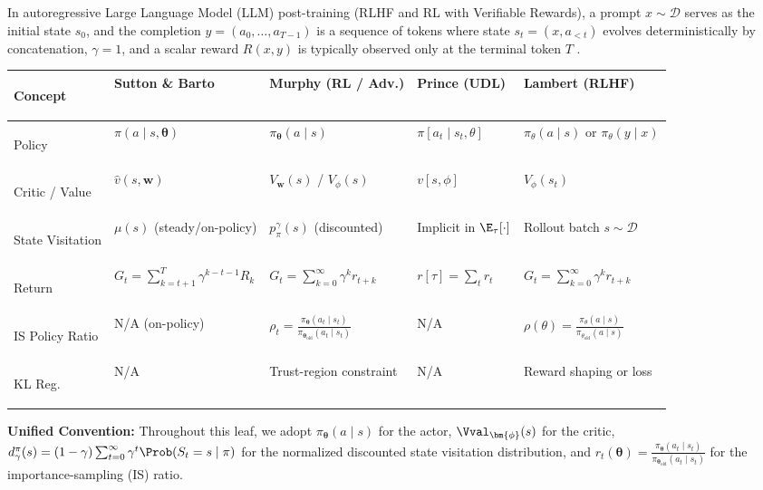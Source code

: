 \documentclass[../../../../master.tex]{subfiles}
\begin{document}
In autoregressive Large Language Model (LLM) post-training (RLHF and RL with Verifiable Rewards), a prompt $x \sim \mathcal{D}$ serves as the initial state $s_0$, and the completion $y = (a_0, \dots, a_{T-1})$ is a sequence of tokens where state $s_t = (x, a_{<t})$ evolves deterministically by concatenation, $\gamma = 1$, and a scalar reward $R(x, y)$ is typically observed only at the terminal token $T$ .

\begin{crossbook}
\footnotesize
\begin{tabularx}{\textwidth}{@{}>{\bfseries\raggedright\arraybackslash}p{2.1cm} X X X X@{}}
\toprule
Concept & Sutton \& Barto & Murphy (RL / Adv.) & Prince (UDL) & Lambert (RLHF) \\
\midrule
Policy & $\pi(a \mid s, \bm{\theta})$ & $\pi_{\bm{\theta}}(a \mid s)$ & $\pi[a_t \mid s_t, \theta]$ & $\pi_\theta(a \mid s)$ or $\pi_\theta(y \mid x)$ \\
Critic / Value & $\hat{v}(s, \mathbf{w})$ & $V_{\mathbf{w}}(s)$ / $V_\phi(s)$ & $v[s, \phi]$ & $V_\phi(s_t)$ \\
State Visitation & $\mu(s)$ (steady/on-policy) & $p_\pi^\gamma(s)$ (discounted) & Implicit in $\E_\tau[\cdot]$ & Rollout batch $s \sim \mathcal{D}$ \\
Return & $G_t = \sum_{k=t+1}^T \gamma^{k-t-1} R_k$ & $G_t = \sum_{k=0}^\infty \gamma^k r_{t+k}$ & $r[\tau] = \sum_{t} r_t$ & $G_t = \sum_{k=0}^\infty \gamma^k r_{t+k}$ \\
IS Policy Ratio & N/A (on-policy) & $\rho_t = \frac{\pi_{\bm{\theta}}(a_t \mid s_t)}{\pi_{\bm{\theta}_{\mathrm{old}}}(a_t \mid s_t)}$ & N/A & $\rho(\theta) = \frac{\pi_\theta(a \mid s)}{\pi_{\theta_{\mathrm{old}}}(a \mid s)}$ \\
KL Reg. & N/A & Trust-region constraint & N/A & Reward shaping or loss \\
\bottomrule
\end{tabularx}
\par\medskip
\noindent\textbf{Unified Convention:} Throughout this leaf, we adopt $\pi_{\bm{\theta}}(a \mid s)$ for the actor, $\Vval_{\bm{\phi}}(s)$ for the critic, $d^{\pi}_{\gamma}(s) = (1-\gamma)\sum_{t=0}^\infty \gamma^t \Prob(S_t = s \mid \pi)$ for the normalized discounted state visitation distribution, and $r_t(\bm{\theta}) = \frac{\pi_{\bm{\theta}}(a_t \mid s_t)}{\pi_{\bm{\theta}_{\mathrm{old}}}(a_t \mid s_t)}$ for the importance-sampling (IS) ratio.
\end{crossbook}
\end{document}

